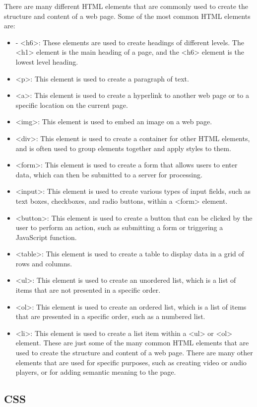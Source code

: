 {There are many different HTML elements that are commonly used to create the structure and content of a web page. Some of the most common HTML elements are:
\begin{itemize}
\item <h1> - <h6>: These elements are used to create headings of different levels. The <h1> element is the main heading of a page, and the <h6> element is the lowest level heading.
\item <p>: This element is used to create a paragraph of text.
\item <a>: This element is used to create a hyperlink to another web page or to a specific location on the current page.
\item <img>: This element is used to embed an image on a web page.
\item <div>: This element is used to create a container for other HTML elements, and is often used to group elements together and apply styles to them.
\item <form>: This element is used to create a form that allows users to enter data, which can then be submitted to a server for processing.
\item <input>: This element is used to create various types of input fields, such as text boxes, checkboxes, and radio buttons, within a <form> element.
\item <button>: This element is used to create a button that can be clicked by the user to perform an action, such as submitting a form or triggering a JavaScript function.
\item <table>: This element is used to create a table to display data in a grid of rows and columns.
\item <ul>: This element is used to create an unordered list, which is a list of items that are not presented in a specific order.
\item <ol>: This element is used to create an ordered list, which is a list of items that are presented in a specific order, such as a numbered list.
\item <li>: This element is used to create a list item within a <ul> or <ol> element.
These are just some of the many common HTML elements that are used to create the structure and content of a web page. There are many other elements that are used for specific purposes, such as creating video or audio players, or for adding semantic meaning to the page.
\end{itemize}


\subsection{CSS}

}
